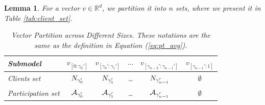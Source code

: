 \documentclass{article}
\theoremstyle{plain}
\newtheorem{lemma}[theorem]{Lemma}
\theoremstyle{definition}
\theoremstyle{remark}
\renewcommand{\eqref}[1]{Equation (\ref{#1})}
\begin{document}
\renewcommand{\r}{\mathbb{R}^d}
\renewcommand{\v}[1]{v_{\left[\gamma_{#1-1}':\gamma_{#1}'\right]}}
\begin{lemma} \label{lemma:1}
For a vector $v \in \r$, we partition it into $n$ sets, where we present it in Table \ref{tab:client_set}.
\begin{table}[h]
    \renewcommand{\arraystretch}{1.2}
    \centering
    \caption{Vector Partition across Different Sizes. These notations are the same as the definition in \eqref{eq:pt_avg}. }
    \begin{tabular}{l|c|c|c|c|c}
    \hline
        Submodel & $v_{\left[0:\gamma_{0}'\right]}$ & $v_{\left[\gamma_{0}':\gamma_{1}'\right]}$ & $\cdots$ & $v_{\left[\gamma_{n-2}':\gamma_{n-1}'\right]}$ & $v_{\left[\gamma_{n-1}':1\right]}$ \\\hline
        Clients set & $N_{\gamma_{0}'}$ & $N_{\gamma_{1}'}$ & \dots & $N_{\gamma_{n-1}'}$ & $\emptyset$ \\\hline
        Participation set & $\mathcal{A}_{\gamma_{0}'}$ & $\mathcal{A}_{\gamma_{1}'}$ & \dots & $\mathcal{A}_{\gamma_{n-1}'}$ & $\emptyset$\\\hline
    \end{tabular}


\end{table}
\end{lemma}
\end{document}
